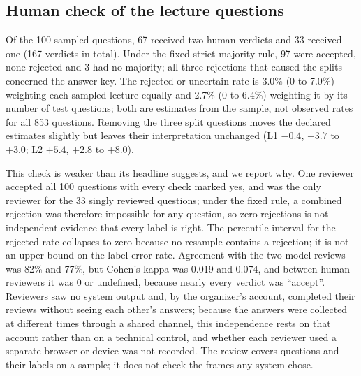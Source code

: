 \subsection{Human check of the lecture questions}
\label{sec:human}
Of the 100 sampled questions, 67 received two human verdicts and 33 received one (167 verdicts in total).
Under the fixed strict-majority rule, 97 were accepted, none rejected and 3 had no majority; all three rejections that caused the splits concerned the answer key.
The rejected-or-uncertain rate is 3.0\% (0 to 7.0\%) weighting each sampled lecture equally and 2.7\% (0 to 6.4\%) weighting it by its number of test questions; both are estimates from the sample, not observed rates for all 853 questions.
Removing the three split questions moves the declared estimates slightly but leaves their interpretation unchanged (L1 $-0.4$, $-3.7$ to $+3.0$; L2 $+5.4$, $+2.8$ to $+8.0$).

This check is weaker than its headline suggests, and we report why.
One reviewer accepted all 100 questions with every check marked yes, and was the only reviewer for the 33 singly reviewed questions; under the fixed rule, a combined rejection was therefore impossible for any question, so zero rejections is not independent evidence that every label is right.
The percentile interval for the rejected rate collapses to zero because no resample contains a rejection; it is not an upper bound on the label error rate.
Agreement with the two model reviews was 82\% and 77\%, but Cohen's kappa was 0.019 and 0.074, and between human reviewers it was 0 or undefined, because nearly every verdict was ``accept''.
Reviewers saw no system output and, by the organizer's account, completed their reviews without seeing each other's answers; because the answers were collected at different times through a shared channel, this independence rests on that account rather than on a technical control, and whether each reviewer used a separate browser or device was not recorded.
The review covers questions and their labels on a sample; it does not check the frames any system chose.

